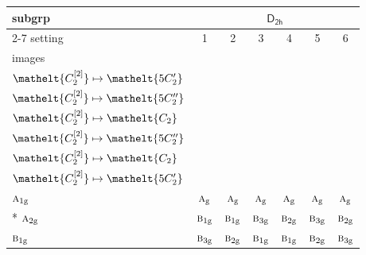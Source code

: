 \documentclass[10pt,a4paper]{article}
\numberwithin{equation}{section}
\newcommand{\eltfont}[1]{{\let\sigma\eltsigma\mathelt{#1}}}
\newcommand{\grp}[1]{\mathsf{#1}}
\newcommand{\irr}[1]{\text{\normalfont\scshape #1}}
\newcommand{\cls}[1]{\eltfont{#1}}
\newcommand{\ptag}[1]{\mathrm{#1}}
\newcommand{\genidx}[2]{#1^{[\mathrm{#2}]}}
\begin{document}
{\small\begin{longtable}{@{}lcccccc@{}}\toprule
subgrp & \multicolumn{6}{c}{\href{D2h.pdf}{$\grp{D_{2h}}$}}\\\cmidrule(lr){2-7}
setting & 1 & 2 & 3 & 4 & 5 & 6\\
images & {\scriptsize\begin{tabular}[t]{@{}c@{}}$\cls{\genidx{C_{2}}{1}} \mapsto \cls{C_{2}}$\\$\cls{\genidx{C_{2}}{2}} \mapsto \cls{5C_{2}'}$\end{tabular}} & {\scriptsize\begin{tabular}[t]{@{}c@{}}$\cls{\genidx{C_{2}}{1}} \mapsto \cls{C_{2}}$\\$\cls{\genidx{C_{2}}{2}} \mapsto \cls{5C_{2}''}$\end{tabular}} & {\scriptsize\begin{tabular}[t]{@{}c@{}}$\cls{\genidx{C_{2}}{1}} \mapsto \cls{5C_{2}'}$\\$\cls{\genidx{C_{2}}{2}} \mapsto \cls{C_{2}}$\end{tabular}} & {\scriptsize\begin{tabular}[t]{@{}c@{}}$\cls{\genidx{C_{2}}{1}} \mapsto \cls{5C_{2}'}$\\$\cls{\genidx{C_{2}}{2}} \mapsto \cls{5C_{2}''}$\end{tabular}} & {\scriptsize\begin{tabular}[t]{@{}c@{}}$\cls{\genidx{C_{2}}{1}} \mapsto \cls{5C_{2}''}$\\$\cls{\genidx{C_{2}}{2}} \mapsto \cls{C_{2}}$\end{tabular}} & {\scriptsize\begin{tabular}[t]{@{}c@{}}$\cls{\genidx{C_{2}}{1}} \mapsto \cls{5C_{2}''}$\\$\cls{\genidx{C_{2}}{2}} \mapsto \cls{5C_{2}'}$\end{tabular}}\\\midrule\endhead
\bottomrule\endfoot\endlastfoot
$\irr{a}_{1\ptag{g}}$ & $\irr{a}_{\ptag{g}}$ & $\irr{a}_{\ptag{g}}$ & $\irr{a}_{\ptag{g}}$ & $\irr{a}_{\ptag{g}}$ & $\irr{a}_{\ptag{g}}$ & $\irr{a}_{\ptag{g}}$\\*
$\irr{a}_{2\ptag{g}}$ & $\irr{b}_{1\ptag{g}}$ & $\irr{b}_{1\ptag{g}}$ & $\irr{b}_{3\ptag{g}}$ & $\irr{b}_{2\ptag{g}}$ & $\irr{b}_{3\ptag{g}}$ & $\irr{b}_{2\ptag{g}}$\\
$\irr{b}_{1\ptag{g}}$ & $\irr{b}_{3\ptag{g}}$ & $\irr{b}_{2\ptag{g}}$ & $\irr{b}_{1\ptag{g}}$ & $\irr{b}_{1\ptag{g}}$ & $\irr{b}_{2\ptag{g}}$ & $\irr{b}_{3\ptag{g}}$\\

\end{longtable}}
\end{document}
